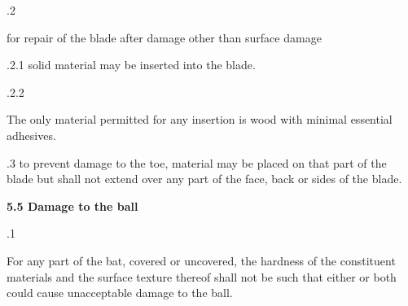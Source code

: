 \documentclass[12pt]{article}
\begin{document}
\vspace{\baselineskip}
{\fontsize{9pt}{10.8pt}.2 \tabto{0.49in} {\fontsize{8pt}{9.6pt}\selectfont for repair of the blade after damage other than surface damage\par}\par}\par


\vspace{\baselineskip}
\begin{adjustwidth}{0.49in}{0.0in}
{\fontsize{9pt}{10.8pt}.2.1 \tabto{1.17in} solid material may be inserted into the blade.\par}\par

\end{adjustwidth}


\vspace{\baselineskip}
\begin{adjustwidth}{0.49in}{0.0in}
{\fontsize{9pt}{10.8pt}.2.2 \tabto{1.17in} {\fontsize{8pt}{9.6pt}\selectfont The only material permitted for any insertion is wood with minimal essential adhesives.\par}\par}\par

\end{adjustwidth}


\vspace{\baselineskip}
\begin{adjustwidth}{0.5in}{0.06in}
{\fontsize{9pt}{10.8pt}.3 \tabto{0.49in} to prevent damage to the toe, material may be placed on that part of the blade but shall not extend over any part of the face, back or sides of the blade.\par}\par

\end{adjustwidth}


\vspace{\baselineskip}
{\fontsize{11pt}{13.2pt}\selectfont \textbf{5.5 \tabto{0.47in} Damage to the ball}\par}\par


\vspace{\baselineskip}
\begin{adjustwidth}{0.5in}{0.28in}
{\fontsize{9pt}{10.8pt}.1 \tabto{0.49in} {\fontsize{8pt}{9.6pt}\selectfont For any part of the bat, covered or uncovered, the hardness of the constituent materials and the surface texture thereof shall not be such that either or both could cause unacceptable damage to the ball.\par}\par}\par

\end{adjustwidth}
\end{document}
